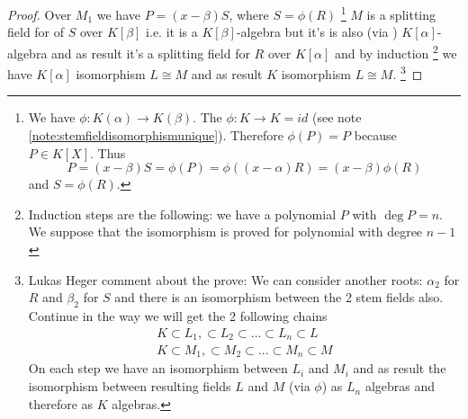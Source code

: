 \begin{theorem}
\begin{proof}
    Over $M_1$ we have $P = (x - \beta) S$, where
    $S = \phi\left(R\right)$
    \footnote{
      We have $\phi: K\left(\alpha\right) \to
      K\left(\beta\right)$. The $\phi: K \to K = id$ (see note
      \ref{note:stemfieldisomorphismunique}).
      Therefore
      $\phi\left(P\right) = P$ because $P \in K\left[X\right]$.
      Thus
      \[
      P = (x - \beta) S = \phi\left(P\right) =
      \phi\left((x - \alpha) R\right) =
      (x - \beta) \phi\left(R\right)
      \]
      and $S = \phi\left(R\right)$.
    }
    $M$ is a splitting field for of $S$ over $K\left[\beta\right]$
    i.e. it is a $K\left[\beta\right]$-algebra but it's is also (via
    ) $K\left[\alpha\right]$-algebra and as
    result it's a splitting field for $R$ over $K\left[\alpha\right]$
    and by induction
    \footnote{
      Induction steps are the following: we have a polynomial $P$ with
      $\deg P = n$. We suppose that the isomorphism is proved for
      polynomial with degree $n-1$
    }
    we have $K\left[\alpha\right]$ isomorphism $L \cong M$ and as
    result $K$ isomorphism $L \cong M$.
    \footnote{
      Lukas Heger comment about the prove:
      We can consider 
      another roots: $\alpha_2$ for $R$ and $\beta_2$ for $S$
      and there is an isomorphism between the 2 stem fields
      also. Continue in the way we will get the 2 following chains
      \begin{eqnarray}
        K \subset L_1, \subset L_2 \subset \dots \subset L_n \subset L
        \nonumber \\
        K \subset M_1, \subset M_2 \subset \dots \subset M_n \subset M
        \nonumber
      \end{eqnarray}
      On each step we have an isomorphism between $L_i$ and $M_i$ and as
      result the isomorphism between resulting fields $L$ and $M$ (via
      $\phi$) as $L_n$ algebras and therefore as $K$ algebras. 
    }
  \end{proof}
  \label{thm:lec2_1}
\end{theorem}

